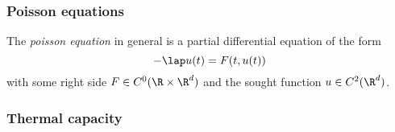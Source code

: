 \documentclass{subfiles}
\begin{document}
        \subsubsection*{Poisson equations}
            The \emph{poisson equation} in general is a partial differential equation of the form
            \[-\lap u(t) = F(t,u(t))\]
            with some right side $F\in C^0(\R\times\R^d)$ and the sought function $u\in C^2(\R^d)$. 

        \subsubsection*{Thermal capacity}


\end{document}
